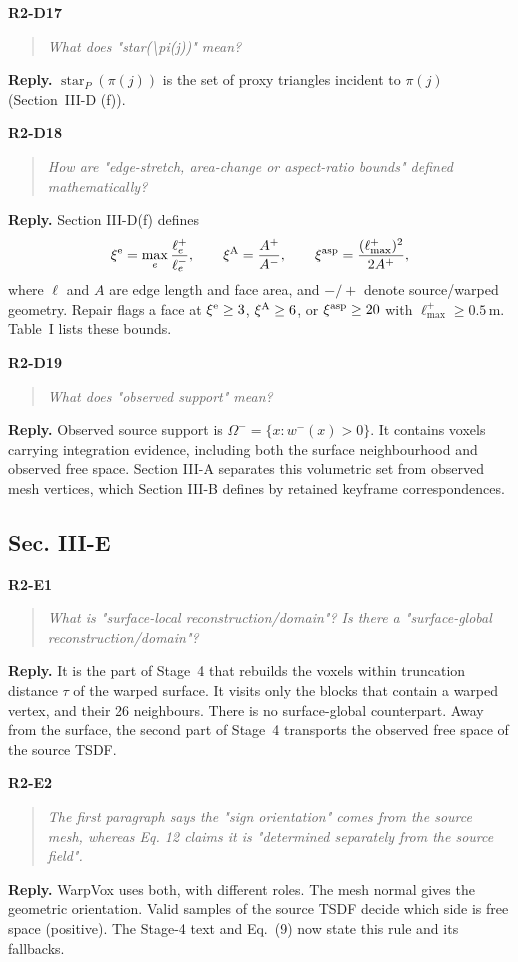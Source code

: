 \documentclass[11pt,a4paper]{article}
\newcommand{\point}[2]{\par\medskip\textbf{#1}\par\begin{quote}\itshape #2\end{quote}}
\newenvironment{reply}{\begingroup\color{replyblue}\textbf{Reply.} }{\par\endgroup}
\begin{document}
\point{R2-D17}{What does "star(\textbackslash{}pi(j))" mean?}
\begin{reply}
$\operatorname{star}_P(\pi(j))$ is the set of proxy triangles incident to $\pi(j)$ (Section~III-D (f)).
\end{reply}

\point{R2-D18}{How are "edge-stretch, area-change or aspect-ratio bounds" defined mathematically?}
\begin{reply}
Section III-D(f) defines
\[
\xi^{\rm e}=\max_e\frac{\ell_e^+}{\ell_e^-},\qquad
\xi^{\rm A}=\frac{A^+}{A^-},\qquad
\xi^{\rm asp}=\frac{(\ell^+_{\max})^2}{2A^+},
\]
where $\ell$ and $A$ are edge length and face area, and $-/+$ denote source/warped geometry. Repair flags a face at $\xi^{\rm e}\ge3$, $\xi^{\rm A}\ge6$, or $\xi^{\rm asp}\ge20$ with $\ell^+_{\max}\ge0.5$\,m. Table~I lists these bounds.
\end{reply}

\point{R2-D19}{What does "observed support" mean?}
\begin{reply}
Observed source support is $\Omega^-=\{x:w^-(x)>0\}$. It contains voxels carrying integration evidence, including both the surface neighbourhood and observed free space. Section III-A separates this volumetric set from observed mesh vertices, which Section III-B defines by retained keyframe correspondences.
\end{reply}

\subsection*{Sec. III-E}

\point{R2-E1}{What is "surface-local reconstruction/domain"? Is there a "surface-global reconstruction/domain"?}
\begin{reply}
It is the part of Stage~4 that rebuilds the voxels within truncation distance $\tau$ of the warped surface. It visits only the blocks that contain a warped vertex, and their 26 neighbours. There is no surface-global counterpart. Away from the surface, the second part of Stage~4 transports the observed free space of the source TSDF.
\end{reply}

\point{R2-E2}{The first paragraph says the "sign orientation" comes from the source mesh, whereas Eq. 12 claims it is "determined separately from the source field".}
\begin{reply}
WarpVox uses both, with different roles. The mesh normal gives the geometric orientation. Valid samples of the source TSDF decide which side is free space (positive). The Stage-4 text and Eq.~(9) now state this rule and its fallbacks.
\end{reply}
\end{document}
